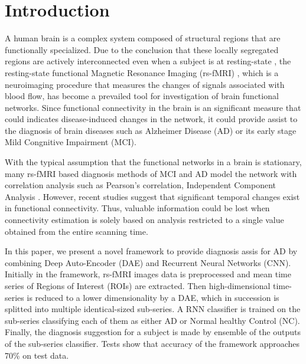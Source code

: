 \section{Introduction}

A human brain is a complex system composed of structural regions that are functionally specialized. Due to the conclusion that these locally segregated regions are actively interconnected even when a subject is at resting-state \cite{biswal95}, the resting-state functional Magnetic Resonance Imaging (rs-fMRI) , which is a neuroimaging procedure that measures the changes of signals associated with blood flow, has become a prevailed tool for investigation of brain functional networks. Since functional connectivity in the brain is an significant measure that could indicates disease-induced changes in the network, it could provide assist to the diagnosis of brain diseases such as Alzheimer Disease (AD) or its early stage Mild Congnitive Impairment (MCI).

With the typical assumption that the functional networks in a brain is stationary, many rs-fMRI based diagnosis methods of MCI and AD model the network with correlation analysis such as Pearson’s correlation, Independent Component Analysis \cite{li12}. However, recent studies \cite{hutch13} suggest that significant temporal changes exist in functional connectivity. Thus, valuable information could be lost when connectivity estimation is solely based on analysis restricted to a single value obtained from the entire scanning time.

In this paper, we present a novel framework to provide diagnosis assis for AD by combining Deep Auto-Encoder (DAE) and Recurrent Neural Networks (CNN).  Initially in the framework, rs-fMRI images data is preprocessed and mean time series of Regions of Interest (ROIs) are extracted. Then high-dimensional time-series is reduced to a lower dimensionality by a DAE, which in succession is splitted into multiple identical-sized sub-series. A RNN classifier is trained on the sub-series classifying each of them as either AD or Normal healthy Control (NC). Finally, the diagnosis suggestion for a subject is made by ensemble of the outputs of the sub-series classifier. Tests show that accuracy of the framework approaches 70\% on test data.